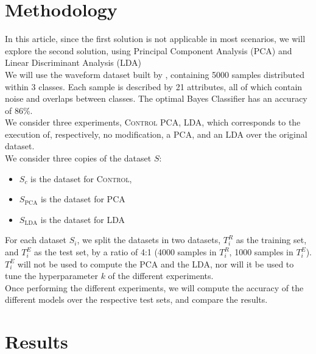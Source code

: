 	\section{Methodology} 
	In this article, since the first solution is not applicable in most scenarios, we will explore the second solution, using Principal Component Analysis (PCA) \cite{Jackson1991} and Linear Discriminant Analysis (LDA) \cite{balakrishnama1998linear}\\
	We will use the waveform dataset built by \citet{waveform}, containing 5000 samples distributed within 3 classes. Each sample is described by 21 attributes, all of which contain noise and overlaps between classes. The optimal Bayes Classifier has an accuracy of 86\%.\\
	We consider three experiments, \textsc{Control} \textsc{PCA}, \textsc{LDA}, which corresponds to the execution of, respectively, no modification, a PCA, and an LDA over the original dataset.\\
	We consider three copies of the dataset $S$:
	\begin{itemize}
		\item $S_c$ is the dataset for \textsc{Control},
		\item $S_{\text{PCA}}$ is the dataset for \textsc{PCA}
		\item $S_{\text{LDA}}$ is the dataset for \textsc{LDA} 
	\end{itemize}
	For each dataset $S_i$, we split the datasets in two datasets, $T^R_i$ as the training set, and $T^E_i$ as the test set, by a ratio of 4:1 (4000 samples in $T^R_i$, 1000 samples in $T^E_i$).\\
	$T^E_i$ will not be used to compute the PCA and the LDA, nor will it be used to tune the hyperparameter $k$ of the different experiments. \\
	Once performing the different experiments, we will compute the accuracy of the different models over the respective test sets, and compare the results.
	
	\section{Results}
	
